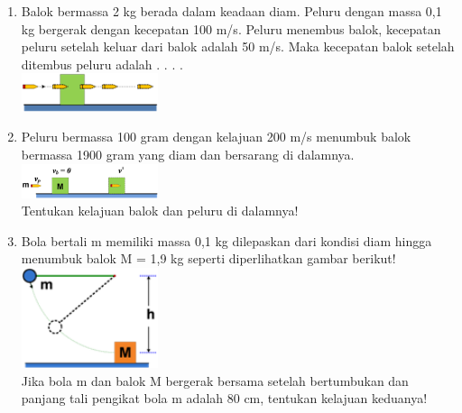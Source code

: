 \documentclass[10pt,a4paper]{extarticle}
\begin{document}
\begin{multicols*}{2}
\begin{enumerate}
\item Balok bermassa 2 kg berada dalam keadaan diam. Peluru dengan massa 0,1 kg bergerak dengan kecepatan 100 m/s. Peluru menembus balok, kecepatan peluru setelah keluar dari balok adalah 50 m/s. Maka kecepatan balok setelah ditembus peluru adalah . . . .\\
\includegraphics[width=4cm]{pic/mom4}\\
\vspace{3cm}

\item Peluru bermassa 100 gram dengan kelajuan 200 m/s menumbuk balok bermassa 1900 gram yang diam dan bersarang di dalamnya. \\
\includegraphics[width=4cm]{pic/mom5}\\
Tentukan kelajuan balok dan peluru di dalamnya!
\vspace{3cm}

\item Bola bertali m memiliki massa 0,1 kg dilepaskan dari kondisi diam hingga menumbuk balok M = 1,9 kg seperti diperlihatkan gambar berikut! \\
\includegraphics[width=4cm]{pic/mom7}\\
Jika bola m dan balok M bergerak bersama setelah bertumbukan dan panjang tali pengikat bola m adalah 80 cm, tentukan kelajuan keduanya!
\vspace{3cm}


\end{enumerate}
\end{multicols*}
\end{document}

